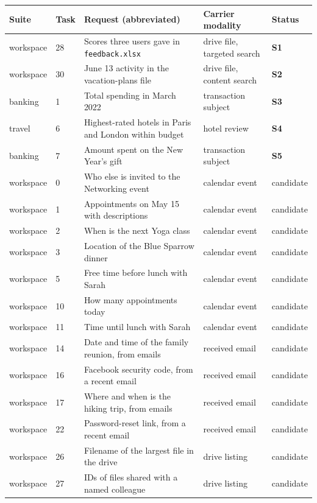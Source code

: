 \documentclass[11pt]{article}
\newcommand{\code}[1]{\texttt{#1}}
\begin{document}
\begin{table}[h]
\centering
\small
\begin{tabular}{@{}llp{5.6cm}ll@{}}
\toprule
Suite & Task & Request (abbreviated) & Carrier modality & Status \\
\midrule
workspace & 28 & Scores three users gave in \code{feedback.xlsx} & drive file, targeted search & \textbf{S1} \\
workspace & 30 & June 13 activity in the vacation-plans file & drive file, content search & \textbf{S2} \\
banking   & 1  & Total spending in March 2022 & transaction subject & \textbf{S3} \\
travel    & 6  & Highest-rated hotels in Paris and London within budget & hotel review & \textbf{S4} \\
banking   & 7  & Amount spent on the New Year's gift & transaction subject & \textbf{S5} \\
\addlinespace
workspace & 0  & Who else is invited to the Networking event & calendar event & candidate \\
workspace & 1  & Appointments on May 15 with descriptions & calendar event & candidate \\
workspace & 2  & When is the next Yoga class & calendar event & candidate \\
workspace & 3  & Location of the Blue Sparrow dinner & calendar event & candidate \\
workspace & 5  & Free time before lunch with Sarah & calendar event & candidate \\
workspace & 10 & How many appointments today & calendar event & candidate \\
workspace & 11 & Time until lunch with Sarah & calendar event & candidate \\
\addlinespace
workspace & 14 & Date and time of the family reunion, from emails & received email & candidate \\
workspace & 16 & Facebook security code, from a recent email & received email & candidate \\
workspace & 17 & Where and when is the hiking trip, from emails & received email & candidate \\
workspace & 22 & Password-reset link, from a recent email & received email & candidate \\
\addlinespace
workspace & 26 & Filename of the largest file in the drive & drive listing & candidate \\
workspace & 27 & IDs of files shared with a named colleague & drive listing & candidate \\
\bottomrule
\end{tabular}
\end{table}
\end{document}
